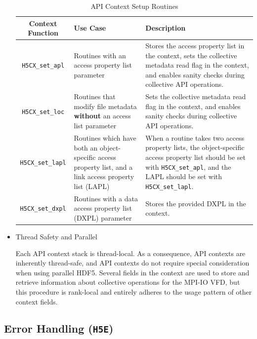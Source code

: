 \begin{itemize}
\begin{table}[h!]
\begin{tabular}{||c|m{}|m{}||}
\hline
\textbf{Context Function} & \textbf{Use Case}  & \textbf{Description} \\  [0.5ex] 
\hline\hline
\texttt{H5CX\_set\_apl} & Routines with an access property list parameter & Stores the access property list in the context, sets the collective metadata read flag in the context, and enables sanity checks during collective API operations. \\
\hline
\texttt{H5CX\_set\_loc} & Routines that modify file metadata \textbf{without} an access list parameter & Sets the collective metadata read flag in the context, and enables sanity checks during collective API operations. \\
\hline
\texttt{H5CX\_set\_lapl} &  Routines which have both an object-specific access property list, and a link access property list (LAPL) & When a routine takes two access property lists, the object-specific access property list should be set with \texttt{H5CX\_set\_apl}, and the LAPL should be set with \texttt{H5CX\_set\_lapl}. \\
\hline
\texttt{H5CX\_set\_dxpl} &  Routines with a data access property list (DXPL) parameter & Stores the provided DXPL in the context. \\
\hline
\end{tabular}
\caption{API Context Setup Routines}
\label{table:H5CX_functions}
\end{table}

\item Thread Safety and Parallel

Each API context stack is thread-local. As a consequence, API contexts are inherently thread-safe, and API contexts do not require special consideration when using parallel HDF5. Several fields in the context are used to store and retrieve information about collective operations for the MPI-IO VFD, but this procedure is rank-local and entirely adheres to the usage pattern of other context fields.

\end{itemize}

\subsection{Error Handling (\texttt{H5E})}

